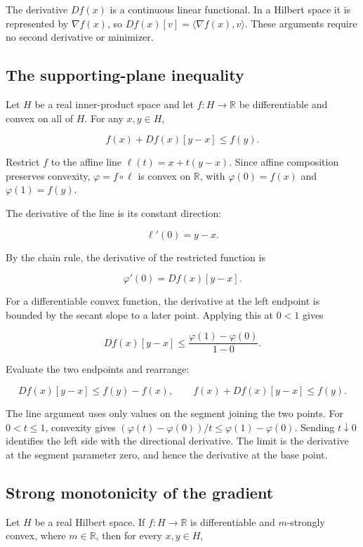 \documentclass[11pt,a4paper]{article}
\begin{document}
The derivative \(Df(x)\) is a continuous linear functional. In a Hilbert space it is represented by \(\nabla f(x)\), so \(Df(x)[v]=\langle\nabla f(x),v\rangle\). These arguments require no second derivative or minimizer.


\subsection{\texorpdfstring{The supporting-plane inequality}{The supporting-plane inequality}}


Let \(H\) be a real inner-product space and let \(f:H\to\mathbb R\) be differentiable and convex on all of \(H\). For any \(x,y\in H\),

\[f(x)+Df(x)[y-x]\le f(y).\]

Restrict \(f\) to the affine line \(\ell(t)=x+t(y-x)\). Since affine composition preserves convexity, \(\varphi=f\circ\ell\) is convex on \(\mathbb R\), with \(\varphi(0)=f(x)\) and \(\varphi(1)=f(y)\).



The derivative of the line is its constant direction:

\[\ell'(0)=y-x.\]

By the chain rule, the derivative of the restricted function is

\[\varphi'(0)=Df(x)[y-x].\]

For a differentiable convex function, the derivative at the left endpoint is bounded by the secant slope to a later point. Applying this at \(0<1\) gives

\[Df(x)[y-x]\le\frac{\varphi(1)-\varphi(0)}{1-0}.\]

Evaluate the two endpoints and rearrange:

\[Df(x)[y-x]\le f(y)-f(x),\qquad f(x)+Df(x)[y-x]\le f(y).\]

The line argument uses only values on the segment joining the two points. For \(0<t\le1\), convexity gives \((\varphi(t)-\varphi(0))/t\le\varphi(1)-\varphi(0)\). Sending \(t\downarrow0\) identifies the left side with the directional derivative. The limit is the derivative at the segment parameter zero, and hence the derivative at the base point.


\subsection{\texorpdfstring{Strong monotonicity of the gradient}{Strong monotonicity of the gradient}}


Let \(H\) be a real Hilbert space. If \(f:H\to\mathbb R\) is differentiable and \(m\)-strongly convex, where \(m\in\mathbb R\), then for every \(x,y\in H\),
\end{document}
